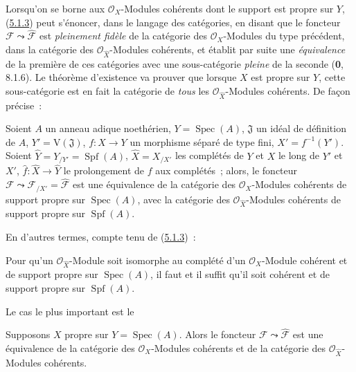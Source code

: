 Lorsqu'on se borne aux $\mathcal O_X$-Modules cohérents dont le support est propre
sur $Y$, (\hyperref[III.5.1.3-fr]{5.1.3}) peut s'énoncer, dans le langage des
catégories, en disant que le foncteur
$\mathcal F\leadsto\widehat{\mathcal F}$ est \emph{pleinement fidèle} de la catégorie des
$\mathcal O_X$-Modules du type précédent, dans la catégorie des
$\mathcal O_{\widehat X}$-Modules cohérents, et établit par suite une \emph{équivalence} de
la première de ces catégories avec une sous-catégorie \emph{pleine} de la seconde
(\textbf{0}, 8.1.6). Le théorème d'existence va prouver que lorsque $X$ est propre sur $Y$,
cette sous-catégorie est en fait la catégorie de \emph{tous} les
$\mathcal O_{\widehat X}$-Modules cohérents. De façon précise~:

\begin{theorem}[5.1.4]
\label{III.5.1.4-fr}
Soient $A$ un anneau adique noethérien, $Y=\operatorname{Spec}(A)$,
$\mathfrak J$ un idéal de définition de $A$, $Y'=\mathrm V(\mathfrak J)$,
$f:X\to Y$ un morphisme séparé de type fini, $X'=f^{-1}(Y')$. Soient
$\widehat Y=Y_{/Y'}=\operatorname{Spf}(A)$, $\widehat X=X_{/X'}$ les complétés de
$Y$ et $X$ le long de $Y'$ et $X'$, $\widehat f:\widehat X\to\widehat Y$ le
prolongement de $f$ aux complétés~; alors, le foncteur
$\mathcal F\leadsto\mathcal F_{/X'}=\widehat{\mathcal F}$ est une équivalence de la
catégorie des $\mathcal O_X$-Modules cohérents de support propre sur
$\operatorname{Spec}(A)$, avec la catégorie des $\mathcal O_{\widehat X}$-Modules
cohérents de support propre sur $\operatorname{Spf}(A)$.
\end{theorem}

En d'autres termes, compte tenu de (\hyperref[III.5.1.3-fr]{5.1.3})~:

\begin{corollary}[5.1.5]
\label{III.5.1.5-fr}
Pour qu'un $\mathcal O_{\widehat X}$-Module soit isomorphe au complété d'un
$\mathcal O_X$-Module cohérent et de support propre sur $\operatorname{Spec}(A)$,
il faut et il suffit qu'il soit cohérent et de support propre sur
$\operatorname{Spf}(A)$.
\end{corollary}

Le cas le plus important est le

\begin{corollary}[5.1.6]
\label{III.5.1.6-fr}
Supposons $X$ propre sur $Y=\operatorname{Spec}(A)$. Alors le foncteur
$\mathcal F\leadsto\widehat{\mathcal F}$ est une équivalence de la catégorie des
$\mathcal O_X$-Modules cohérents et de la catégorie des
$\mathcal O_{\widehat X}$-Modules cohérents.
\end{corollary}

